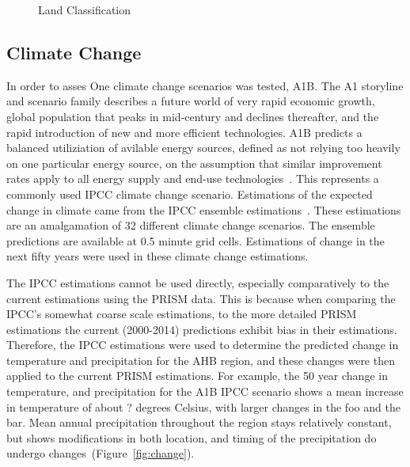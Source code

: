 \documentclass[preprint,12pt]{elsarticle}
\begin{document}

\begin{figure}[hp]
  \centering
  
  \caption{Land Classification}
  \label{fig:land}
\end{figure}

\subsection{Climate Change}
\label{sec:climate}

In order to asses
One climate change scenarios was tested, A1B. 
%
The A1 storyline and scenario family describes a future world of very
rapid economic growth, global population that peaks in mid-century and
declines thereafter, and the rapid introduction of new and more
efficient technologies. A1B predicts a balanced utiliziation of
avilable energy sources, defined as not relying too heavily on one
particular energy source, on the assumption that similar improvement
rates apply to all energy supply and end-use technologies~\cite{}.
%
This represents a commonly used \ac{IPCC} climate change scenario.
Estimations of the expected change in climate came from the IPCC
ensemble estimations~\cite{ipcc-ensemble}.  These estimations are an
amalgamation of 32 different climate change scenarios.  The ensemble
predictions are available at 0.5 minute grid cells.  Estimations of
change in the next fifty years were used in these climate change
estimations.

The \ac{IPCC} estimations cannot be used directly, especially
comparatively to the current estimations using the \ac{PRISM}
data.  This is because when comparing the \ac{IPCC}'s somewhat coarse
scale estimations, to the more detailed \ac{PRISM} estimations the
current (2000-2014) predictions exhibit bias in their estimations.
Therefore, the \ac{IPCC} estimations were used to determine the
predicted change in temperature and precipitation for the \ac {AHB}
region, and these changes were then applied to the current \ac{PRISM}
estimations. For example, the 50 year change in temperature, and
precipitation for the A1B \ac{IPCC} scenario shows a mean
increase in temperature of about ? degrees Celsius, with larger
changes in the foo and the bar.  Mean annual precipitation throughout
the region stays relatively constant, but shows modifications in both
location, and timing of the precipitation do undergo
changes~(Figure~\ref{fig:change}).
\end{document}
